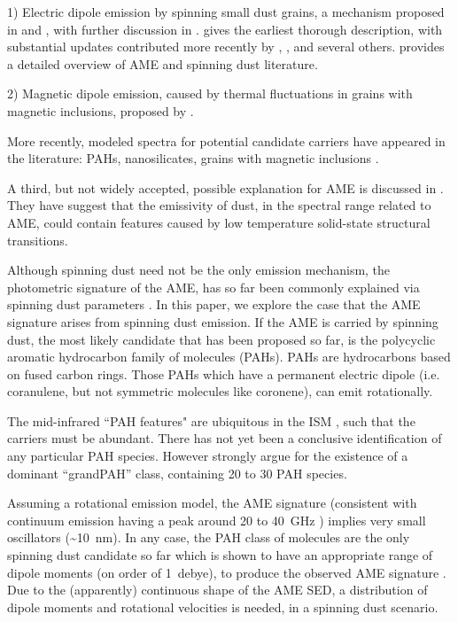 \documentclass[preprint2,longabstract]{aastex}
\begin{document}
 1) Electric dipole emission by spinning small dust grains, a mechanism proposed in \cite{erickson57} and \cite{hoyle70}, with further discussion in \cite{ferrara94}. \cite{draine98b} gives the earliest thorough description, with substantial updates contributed more recently by \cite{ysard10a}, \cite{ali-haimoud09}, \cite{hoang10} and several others. \cite{dickinson13r} provides a detailed overview of AME and spinning dust literature.

 2) Magnetic dipole emission, caused by thermal fluctuations in grains with magnetic inclusions, proposed by \cite{draine99}.

 More recently, modeled spectra for potential candidate carriers have appeared in the literature: PAHs, nanosilicates, grains with magnetic inclusions \citep{draine13, ali-haimoud14, hoang16a}.

A third, but not widely accepted, possible explanation for AME is discussed in \cite{jones09}. They have suggest that the emissivity of dust, in the spectral range related to AME, could contain features caused by low temperature solid-state structural transitions.


     Although spinning dust need not be the only emission mechanism, the photometric signature of the AME, has so far been commonly explained via spinning dust parameters \citep{ysard11,ali-haimoud10}. In this paper, we explore the case that the AME signature arises from spinning dust emission. If the AME is carried by spinning dust, the most likely candidate that has been proposed so far, is the polycyclic aromatic hydrocarbon family of molecules (PAHs). PAHs are hydrocarbons based on fused carbon rings. Those PAHs which have a permanent electric dipole (i.e. coranulene, but not symmetric molecules like coronene), can emit rotationally.

     The mid-infrared ``PAH features" are ubiquitous in the ISM \citep{giard94,onaka96,onaka00,tielens08}, such that the carriers must be abundant. There has not yet been a conclusive identification of any particular PAH species. However \cite{andrews15} strongly argue for the  existence of a dominant ``grandPAH'' class, containing 20 to 30 PAH species.

     Assuming a rotational emission model, the AME signature (consistent with continuum emission having a peak around 20 to 40~GHz ) implies very small oscillators (\textasciitilde{}10~nm). In any case, the PAH class of molecules are the only spinning dust candidate so far which is shown to have an appropriate range of dipole moments (on order of 1~debye), to produce the observed AME signature \citep{draine98b, lovas05, thorwirth07}. Due to the (apparently) continuous shape of the AME SED, a distribution of dipole moments and rotational velocities is needed, in a spinning dust scenario.
\end{document}
